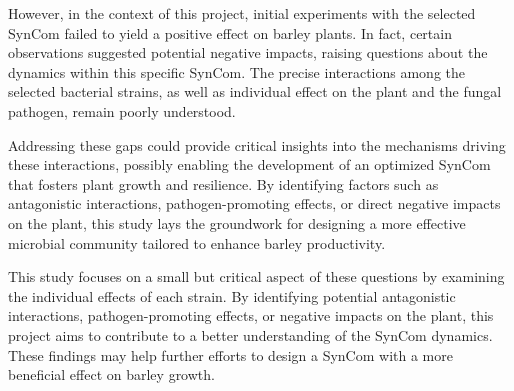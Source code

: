 However, in the context of this project, initial experiments with the selected SynCom failed to yield a positive effect on barley plants. In fact, certain observations suggested potential negative impacts, raising questions about the dynamics within this specific SynCom. The precise interactions among the selected bacterial strains, as well as individual effect on the plant and the fungal pathogen, remain poorly understood.

Addressing these gaps could provide critical insights into the mechanisms driving these interactions, possibly enabling the development of an optimized SynCom that fosters plant growth and resilience. By identifying factors such as antagonistic interactions, pathogen-promoting effects, or direct negative impacts on the plant, this study lays the groundwork for designing a more effective microbial community tailored to enhance barley productivity.

This study focuses on a small but critical aspect of these questions by examining the individual effects of each strain. By identifying potential antagonistic interactions, pathogen-promoting effects, or negative impacts on the plant, this project aims to contribute to a better understanding of the SynCom dynamics. These findings may help further efforts to design a \ac{SynCom} with a more beneficial effect on barley growth.

